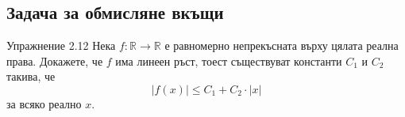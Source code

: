 \subsection*{Задача за обмисляне вкъщи}

\begin{problembox}{Упражнение 2.12}
Нека $f : \mathbb{R} \to \mathbb{R}$ е равномерно непрекъсната върху цялата реална права. Докажете, че $f$ има линеен ръст, тоест съществуват константи $C_1$ и $C_2$ такива, че
\[
|f(x)| \le C_1 + C_2 \cdot |x|
\]
за всяко реално $x$.
\end{problembox}